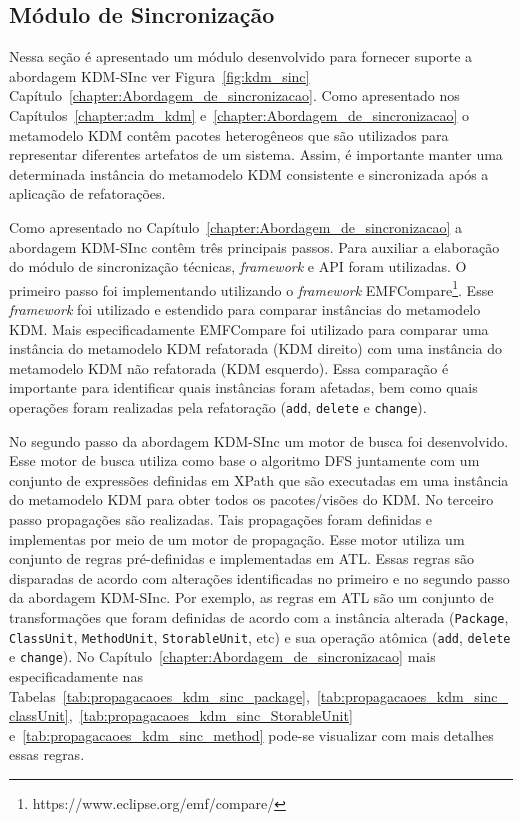 \subsection{Módulo de Sincronização}

Nessa seção é apresentado um módulo desenvolvido para fornecer suporte a abordagem KDM-SInc ver Figura~\ref{fig:kdm_sinc} Capítulo~\ref{chapter:Abordagem_de_sincronizacao}. Como apresentado nos Capítulos~\ref{chapter:adm_kdm} e~\ref{chapter:Abordagem_de_sincronizacao} o metamodelo KDM contêm pacotes heterogêneos que são utilizados para representar diferentes artefatos de um sistema. Assim, é importante manter uma determinada instância do metamodelo KDM consistente e sincronizada após a aplicação de refatorações. 

Como apresentado no Capítulo~\ref{chapter:Abordagem_de_sincronizacao} a abordagem KDM-SInc contêm três principais passos. Para auxiliar a elaboração do módulo de sincronização técnicas, \textit{framework} e API foram utilizadas. O primeiro passo foi implementando utilizando o \textit{framework} EMFCompare\footnote{https://www.eclipse.org/emf/compare/}. Esse \textit{framework} foi utilizado e estendido para comparar instâncias do metamodelo KDM. Mais especificadamente EMFCompare foi utilizado para comparar uma instância do metamodelo KDM refatorada (KDM direito) com uma instância do metamodelo KDM não refatorada (KDM esquerdo). Essa comparação é importante para identificar quais instâncias foram afetadas, bem como quais operações foram realizadas pela refatoração (\texttt{add}, \texttt{delete} e \texttt{change}). 

No segundo passo da abordagem KDM-SInc um motor de busca foi desenvolvido. Esse motor de busca utiliza como base o algoritmo DFS juntamente com um conjunto de expressões definidas em XPath que são executadas em uma instância do metamodelo KDM para obter todos os pacotes/visões do KDM. No terceiro passo propagações são realizadas. Tais propagações foram definidas e implementas por meio de um motor de propagação. Esse motor utiliza um conjunto de regras pré-definidas e implementadas em ATL. Essas regras são disparadas de acordo com alterações identificadas no primeiro e no segundo passo da abordagem KDM-SInc. Por exemplo, as regras em ATL são um conjunto de transformações que foram definidas de acordo com a instância alterada (\texttt{Package}, \texttt{ClassUnit}, \texttt{MethodUnit}, \texttt{StorableUnit}, etc) e sua operação atômica (\texttt{add}, \texttt{delete} e \texttt{change}). No Capítulo~\ref{chapter:Abordagem_de_sincronizacao} mais especificadamente nas Tabelas~\ref{tab:propagacaoes_kdm_sinc_package},~\ref{tab:propagacaoes_kdm_sinc_classUnit},~\ref{tab:propagacaoes_kdm_sinc_StorableUnit} e~\ref{tab:propagacaoes_kdm_sinc_method} pode-se visualizar com mais detalhes essas regras.

